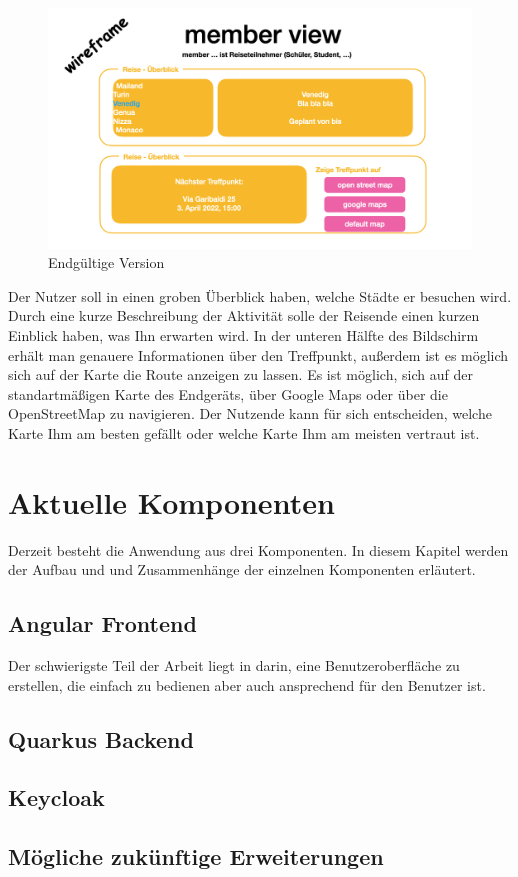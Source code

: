 \begin{figure}[h]
    \centering
    \includegraphics[scale=0.2]{pics/Wireframe.png}
    \caption{Endgültige Version }
    \label{lst:Wireframe}
\end{figure}

Der Nutzer soll in einen groben Überblick haben, welche Städte er besuchen wird. Durch eine kurze Beschreibung der Aktivität solle der Reisende einen kurzen Einblick haben, was Ihn erwarten wird. In der unteren Hälfte des Bildschirm erhält man genauere Informationen über den Treffpunkt, außerdem ist es möglich sich auf der Karte die Route anzeigen zu lassen. Es ist möglich, sich auf der standartmäßigen Karte des Endgeräts, über Google Maps oder über die OpenStreetMap zu navigieren. Der Nutzende kann für sich entscheiden, welche Karte Ihm am besten gefällt oder welche Karte Ihm am meisten vertraut ist. 

\section{Aktuelle Komponenten}
Derzeit besteht die Anwendung aus drei Komponenten. In diesem Kapitel werden der Aufbau und und Zusammenhänge der einzelnen Komponenten erläutert.  


\subsection{Angular Frontend}

Der schwierigste Teil der Arbeit liegt in darin, eine Benutzeroberfläche zu erstellen, die einfach zu bedienen aber auch ansprechend für den Benutzer ist.


\subsection{Quarkus Backend }

\subsection{Keycloak}

\subsection{Mögliche zukünftige Erweiterungen}


